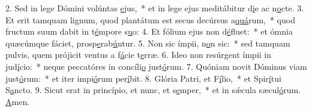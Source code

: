 2. Sed in lege Dómini volúntas \uline{e}jus,~* et in lege ejus meditábitur d\uline{i}e ac n\uline{o}cte.
3. Et erit tamquam lignum, quod plantátum est secus decúrsus a\uline{quá}rum,~* quod fructum suum dabit in t\uline{é}mpore s\uline{u}o:
4. Et fólium ejus non d\uline{é}fluet:~* et ómnia quæcúmque fáciet, prosp\uline{e}rab\uline{ú}ntur.
5. Non sic ímpii, n\uline{o}n sic:~* sed tamquam pulvis, quem prójicit ventus a f\uline{á}cie t\uline{e}rræ.
6. Ideo non resúrgent ímpii in jud\uline{í}cio:~* neque peccatóres in concíli\uline{o} just\uline{ó}rum.
7. Quóniam novit Dóminus viam just\uline{ó}rum:~* et iter impi\uline{ó}rum per\uline{í}bit.
8. Glória Patri, et F\uline{í}lio,~* et Spir\uline{í}tui S\uline{a}ncto.
9. Sicut erat in princípio, et nunc, et s\uline{e}mper,~* et in sǽcula sæcul\uline{ó}rum. \uline{A}men.
